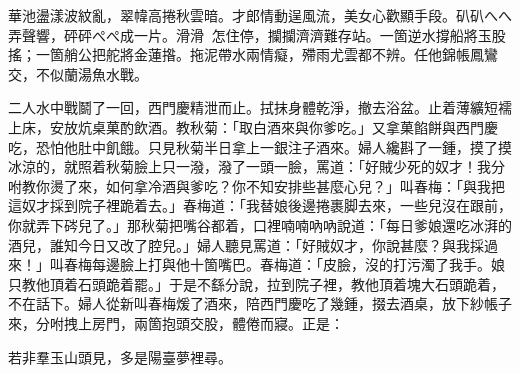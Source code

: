 \begin{myquote}
華池盪漾波紋亂，翠幃高捲秋雲暗。才郎情動逞風流，美女心歡顯手段。𥐙𥐙へへ弄聲響，砰砰ぺぺ成一片。滑滑𣺥𣺥怎住停，攔攔濟濟難存站。一箇逆水撐船將玉股搖；一箇艄公把舵將金蓮揝。拖泥帶水兩情癡，殢雨尤雲都不辨。任他錦帳鳳鸞交，不似蘭湯魚水戰。
\end{myquote}

二人水中戰鬬了一回，西門慶精泄而止。拭抹身體乾淨，撤去浴盆。止着薄纊短襦上床，安放炕桌菓酌飲酒。教秋菊：「取白酒來與你爹吃。」又拿菓餡餅與西門慶吃，恐怕他肚中飢餓。只見秋菊半日拿上一銀注子酒來。婦人纔斟了一鍾，摸了摸冰涼的，就照着秋菊臉上只一潑，潑了一頭一臉，罵道：「好賊少死的奴才！我分咐教你燙了來，如何拿冷酒與爹吃？你不知安排些甚麼心兒？」叫春梅：「與我把這奴才採到院子裡跪着去。」春梅道：「我替娘後邊捲裹脚去來，一些兒沒在跟前，你就弄下硶兒了。」那秋菊把嘴谷都着，口裡喃喃吶吶說道：「每日爹娘還吃冰湃的酒兒，誰知今日又改了腔兒。」婦人聽見罵道：「好賊奴才，你說甚麼？與我採過來！」叫春梅每邊臉上打與他十箇嘴巴。春梅道：「皮臉，沒的打污濁了我手。娘只教他頂着石頭跪着罷。」于是不繇分說，拉到院子裡，教他頂着塊大石頭跪着，不在話下。婦人從新叫春梅煖了酒來，陪西門慶吃了幾鍾，掇去酒桌，放下紗帳子來，分咐拽上房門，兩箇抱頭交股，體倦而寢。正是：

\begin{myquote}
若非羣玉山頭見，多是陽臺夢裡尋。
\end{myquote}


